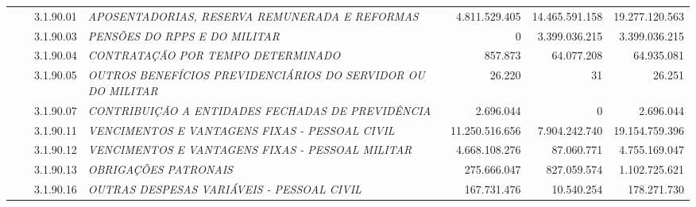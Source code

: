 \documentclass{article}
\begin{document}
\begin{longtable}[c]{m{0.1cm}m{0.1cm}m{0.8cm}|m{8cm}|m{2cm}|m{2cm}|m{2cm}}
\multicolumn{1}{l}{} & \multicolumn{1}{l}{} & \multicolumn{1}{l|}{3.1.90.01} & \multicolumn{1}{L{8cm}|}{\textit{APOSENTADORIAS, RESERVA REMUNERADA E REFORMAS}} & \multicolumn{1}{r|}{4.811.529.405} & \multicolumn{1}{r|}{14.465.591.158} &  \multicolumn{1}{r}{19.277.120.563}\\
\multicolumn{1}{l}{} & \multicolumn{1}{l}{} & \multicolumn{1}{l|}{3.1.90.03} & \multicolumn{1}{L{8cm}|}{\textit{PENSÕES DO RPPS E DO MILITAR}} & \multicolumn{1}{r|}{             0} & \multicolumn{1}{r|}{3.399.036.215} &  \multicolumn{1}{r}{3.399.036.215}\\
\multicolumn{1}{l}{} & \multicolumn{1}{l}{} & \multicolumn{1}{l|}{3.1.90.04} & \multicolumn{1}{L{8cm}|}{\textit{CONTRATAÇÃO POR TEMPO DETERMINADO}} & \multicolumn{1}{r|}{857.873} & \multicolumn{1}{r|}{64.077.208} &  \multicolumn{1}{r}{64.935.081}\\
\multicolumn{1}{l}{} & \multicolumn{1}{l}{} & \multicolumn{1}{l|}{3.1.90.05} & \multicolumn{1}{L{8cm}|}{\textit{OUTROS BENEFÍCIOS PREVIDENCIÁRIOS DO SERVIDOR OU DO MILITAR}} & \multicolumn{1}{r|}{26.220} & \multicolumn{1}{r|}{31} &  \multicolumn{1}{r}{26.251}\\
\multicolumn{1}{l}{} & \multicolumn{1}{l}{} & \multicolumn{1}{l|}{3.1.90.07} & \multicolumn{1}{L{8cm}|}{\textit{CONTRIBUIÇÃO A ENTIDADES FECHADAS DE PREVIDÊNCIA}} & \multicolumn{1}{r|}{2.696.044} & \multicolumn{1}{r|}{             0} &  \multicolumn{1}{r}{2.696.044}\\
\multicolumn{1}{l}{} & \multicolumn{1}{l}{} & \multicolumn{1}{l|}{3.1.90.11} & \multicolumn{1}{L{8cm}|}{\textit{VENCIMENTOS E VANTAGENS FIXAS - PESSOAL CIVIL}} & \multicolumn{1}{r|}{11.250.516.656} & \multicolumn{1}{r|}{7.904.242.740} &  \multicolumn{1}{r}{19.154.759.396}\\
\multicolumn{1}{l}{} & \multicolumn{1}{l}{} & \multicolumn{1}{l|}{3.1.90.12} & \multicolumn{1}{L{8cm}|}{\textit{VENCIMENTOS E VANTAGENS FIXAS - PESSOAL MILITAR}} & \multicolumn{1}{r|}{4.668.108.276} & \multicolumn{1}{r|}{87.060.771} &  \multicolumn{1}{r}{4.755.169.047}\\
\multicolumn{1}{l}{} & \multicolumn{1}{l}{} & \multicolumn{1}{l|}{3.1.90.13} & \multicolumn{1}{L{8cm}|}{\textit{OBRIGAÇÕES PATRONAIS}} & \multicolumn{1}{r|}{275.666.047} & \multicolumn{1}{r|}{827.059.574} &  \multicolumn{1}{r}{1.102.725.621}\\
\multicolumn{1}{l}{} & \multicolumn{1}{l}{} & \multicolumn{1}{l|}{3.1.90.16} & \multicolumn{1}{L{8cm}|}{\textit{OUTRAS DESPESAS VARIÁVEIS - PESSOAL CIVIL}} & \multicolumn{1}{r|}{167.731.476} & \multicolumn{1}{r|}{10.540.254} &  \multicolumn{1}{r}{178.271.730}\\

\end{longtable}
\end{document}
